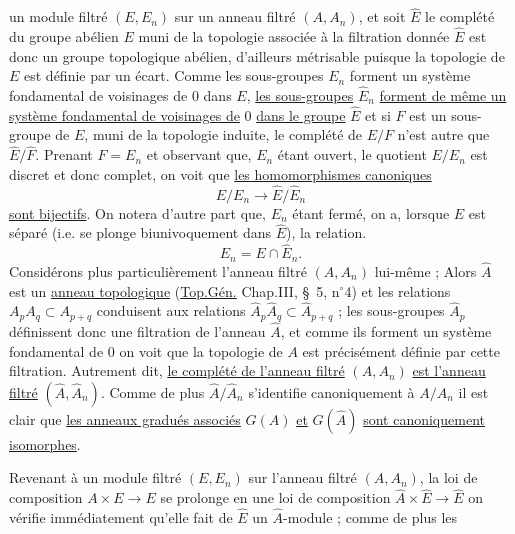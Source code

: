 un module filtré $(E,E_n)$ sur un anneau filtré $(A,A_n)$, et soit $\hat E$ le complété du groupe abélien $E$ muni de la topologie associée à la filtration donnée $\hat E$ est donc un groupe topologique abélien, d'ailleurs métrisable puisque la topologie de $E$ est définie par un écart. Comme les sous-groupes $E_n$ forment un système fondamental de voisinages de 0 dans $E$, \uline{les sous-groupes} $\hat E_n$ \uline{forment de même un système fondamental de voisinages de} 0 \uline{dans le groupe} $\hat E$ et si $F$ est un sous-groupe de $E$, muni de la topologie induite, le complété de $E/F$ n'est autre que $\hat E/\hat F$. Prenant $F=E_n$ et observant que, $E_n$ étant ouvert, le quotient $E/E_n$ est discret et donc complet, on voit que \uline{les homomorphismes canoniques}
\[
E/E_n\longrightarrow\hat E/\hat E_n
\]
\uline{sont bijectifs}. On notera d'autre part que, $E_n$ étant fermé, on a, lorsque $E$ est séparé (i.e. se plonge biunivoquement dans $\hat E$), la relation.
\[
E_n=E\cap\hat E_n.
\]
Considérons plus particulièrement l'anneau filtré $(A,A_n)$ lui-même ; Alors $\hat A$ est un \uline{anneau topologique} (\uline{Top.Gén.} Chap.III, \S\ 5, n$^\circ$4) et les relations $A_pA_q\subset A_{p+q}$ conduisent aux relations $\hat A_p\hat A_q\subset\hat A_{p+q}$ ; les sous-groupes $\hat A_p$ définissent donc une filtration de l'anneau $\hat A$, et comme ils forment un système fondamental de 0 on voit que la topologie de $A$ est précisément définie par cette filtration. Autrement dit, \uline{le complété de l'anneau filtré} $(A,A_n)$ \uline{est l'anneau filtré} $(\hat A,\hat A_n)$. Comme de plus $\hat A/\hat A_n$ s'identifie canoniquement à $A/A_n$ il est clair que \uline{les anneaux gradués associés} $G(A)$ \uline{et} $G(\hat A)$ \uline{sont canoniquement isomorphes}.

Revenant à un module filtré $(E,E_n)$ sur l'anneau filtré $(A,A_n)$, la loi de composition $A\times E\longrightarrow E$ se prolonge en une loi de composition $\hat A\times\hat E\longrightarrow\hat E$ on vérifie immédiatement qu'elle fait de $\hat E$ un $\hat A$-module ; comme de plus les

